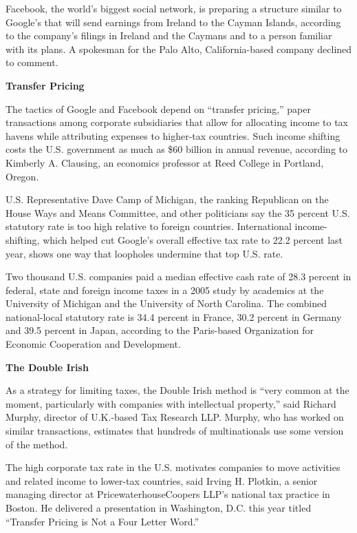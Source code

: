 \begin{select}
Facebook, the world's biggest social network, is preparing a structure similar to Google's that will send earnings from Ireland to the Cayman Islands, according to the company's filings in Ireland and the Caymans and to a person familiar with its plans. A spokesman for the Palo Alto, California-based company declined to comment.

\begin{center} \textbf{Transfer Pricing}
\end{center}

The tactics of Google and Facebook depend on ``transfer pricing,'' paper transactions among corporate subsidiaries that allow for allocating income to tax havens while attributing expenses to higher-tax countries. Such income shifting costs the U.S. government as much as \$60 billion in annual revenue, according to Kimberly A. Clausing, an economics professor at Reed College in Portland, Oregon.

U.S. Representative Dave Camp of Michigan, the ranking Republican on the House Ways and Means Committee, and other politicians say the 35 percent U.S. statutory rate is too high relative to foreign countries. International income-shifting, which helped cut Google's overall effective tax rate to 22.2 percent last year, shows one way that loopholes undermine that top U.S. rate.

Two thousand U.S. companies paid a median effective cash rate of 28.3 percent in federal, state and foreign income taxes in a 2005 study by academics at the University of Michigan and the University of North Carolina. The combined national-local statutory rate is 34.4 percent in France, 30.2 percent in Germany and 39.5 percent in Japan, according to the Paris-based Organization for Economic Cooperation and Development.

\begin{center} \textbf{The Double Irish}
\end{center}

As a strategy for limiting taxes, the Double Irish method is ``very common at the moment, particularly with companies with intellectual property,'' said Richard Murphy, director of U.K.-based Tax Research LLP. Murphy, who has worked on similar transactions, estimates that hundreds of multinationals use some version of the method.

The high corporate tax rate in the U.S. motivates companies to move activities and related income to lower-tax countries, said Irving H. Plotkin, a senior managing director at PricewaterhouseCoopers LLP's national tax practice in Boston. He delivered a presentation in Washington, D.C. this year titled ``Transfer Pricing is Not a Four Letter Word.''


\end{select}
